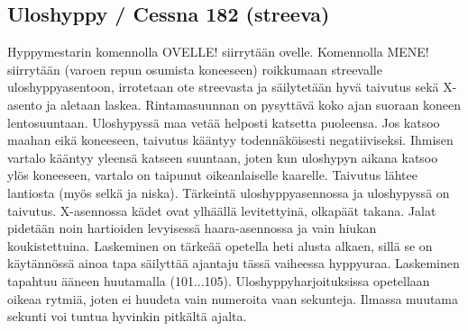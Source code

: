 \subsection{ Uloshyppy / Cessna 182 (streeva) }
\label{pl-alkeiskoulutuksen-suoritukset-uloshyppy-cessna-182-streeva}


Hyppymestarin komennolla OVELLE! siirrytään ovelle. Komennolla MENE! siirrytään (varoen repun osumista koneeseen) roikkumaan streevalle uloshyppyasentoon, irrotetaan ote streevasta ja säilytetään hyvä taivutus sekä X-asento ja aletaan laskea. Rintamasuunnan on pysyttävä koko ajan suoraan koneen lentosuuntaan. Uloshypyssä maa vetää helposti katsetta puoleensa. Jos katsoo maahan eikä koneeseen, taivutus kääntyy todennäköisesti negatiiviseksi. Ihmisen vartalo kääntyy yleensä katseen suuntaan, joten kun uloshypyn aikana katsoo ylös koneeseen, vartalo on taipunut oikeanlaiselle kaarelle. Taivutus lähtee lantiosta (myös selkä ja niska). Tärkeintä uloshyppyasennossa ja uloshypyssä on taivutus. X-asennossa kädet ovat ylhäällä levitettyinä, olkapäät takana. Jalat pidetään noin hartioiden levyisessä haara-asennossa ja vain hiukan koukistettuina. Laskeminen on tärkeää opetella heti alusta alkaen, sillä se on käytännössä ainoa tapa säilyttää ajantaju tässä vaiheessa hyppyuraa. Laskeminen tapahtuu ääneen huutamalla (101...105). Uloshyppyharjoituksissa opetellaan oikeaa rytmiä, joten ei huudeta vain numeroita vaan sekunteja. Ilmassa muutama sekunti voi tuntua hyvinkin pitkältä ajalta. 


